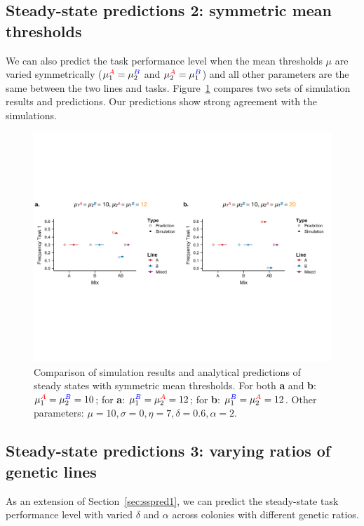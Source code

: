\documentclass[11pt]{article}
\newcommand{\A}{{\color{red}A}}
\newcommand{\B}{{\color{blue}B}}
\begin{document}
\subsection{Steady-state predictions 2: symmetric mean thresholds} \label{sec:sspred2}
We can also predict the task performance level when the mean thresholds $\mu$ are varied symmetrically ($\mu_{1}^{\A} = \mu_{2}^{\B}$ and $\mu_{2}^{\A} = \mu_{1}^{\B}$) and all other parameters are the same between the two lines and tasks. Figure~\ref{fig:5050_comp_mu} compares two sets of simulation results and predictions. Our predictions show strong agreement with the simulations.
\begin{figure}[H]
    \centering
    \includegraphics[trim={0 2.8in 0 2.5in}, clip, width=1\linewidth]{doc/model_comparison_mu.pdf}
    \caption{Comparison of simulation results and analytical predictions of steady states
    with symmetric mean thresholds. For both \textbf{a} and \textbf{b}: $\mu_1^{\A} = \mu_2^{\B} = 10$; for \textbf{a}: $\mu_1^{\B} = \mu_2^{\A} = 12$; for \textbf{b}: $\mu_1^{\B} = \mu_2^{\A} = 12$. Other parameters: $\mu = 10, \sigma = 0, \eta = 7, \delta = 0.6, \alpha = 2$. }
    \label{fig:5050_comp_mu}
\end{figure}

\subsection{Steady-state predictions 3: varying ratios of genetic lines} \label{sec:sspred3}

As an extension of Section~\ref{sec:sspred1}, we can predict the steady-state task performance level with varied $\delta$ and $\alpha$ across colonies with different genetic ratios.
\end{document}
